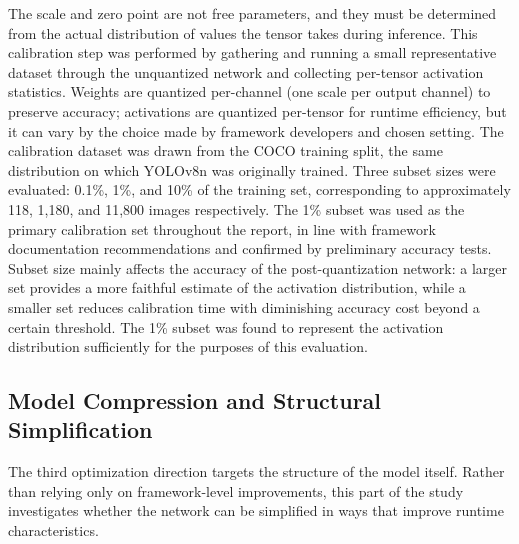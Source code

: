 \documentclass[12pt,a4paper]{report}
\begin{document}
The scale and zero point are not free parameters, and they must be determined from the actual distribution
of values the tensor takes during inference.
This calibration step was performed by gathering and running a small representative dataset through the unquantized
network and collecting per-tensor activation statistics.
Weights are quantized per-channel (one scale per output channel) to preserve accuracy;
activations are quantized per-tensor for runtime efficiency, but it can vary by the choice made by framework developers
and chosen setting. The calibration dataset was drawn from the COCO training split, the same distribution on which
YOLOv8n was originally trained.
Three subset sizes were evaluated: 0.1\%, 1\%, and 10\% of the training set, corresponding to approximately 118, 1,180,
and 11,800 images respectively. The 1\% subset was used as the primary calibration set throughout the report, in line
with framework documentation recommendations and confirmed by preliminary accuracy tests.
Subset size mainly affects the accuracy of the post-quantization network: a larger set provides a more faithful estimate
of the activation distribution, while a smaller set reduces calibration time with diminishing accuracy cost beyond a
certain threshold.
The 1\% subset was found to represent the activation distribution sufficiently for the purposes of this evaluation.

\subsection{Model Compression and Structural Simplification}

The third optimization direction targets the structure of the model itself. Rather than relying only on framework-level
improvements, this part of the study investigates whether the network can be simplified in ways that improve runtime
characteristics.
\end{document}
